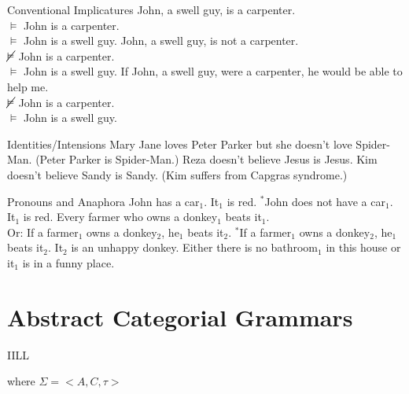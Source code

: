 \documentclass{beamer}
\begin{document}
\begin{frame}{Conventional Implicatures}
John, a swell guy, is a carpenter. \\
$\vDash$ John is a carpenter. \\
$\vDash$ John is a swell guy.
\vfill
\pause
John, a swell guy, is not a carpenter. \\
$\cancel{\vDash}$ John is a carpenter. \\
$\vDash$ John is a swell guy.
\vfill
\pause
If John, a swell guy, were a carpenter, he would be able to help me. \\
$\cancel{\vDash}$ John is a carpenter. \\
$\vDash$ John is a swell guy.
\end{frame}


\begin{frame}{Identities/Intensions}
Mary Jane loves Peter Parker but she doesn't love Spider-Man. (Peter Parker
is Spider-Man.)
\vfill
\pause
Reza doesn't believe Jesus is Jesus.
\vfill
\pause
Kim doesn't believe Sandy is Sandy. (Kim suffers from Capgras syndrome.)
\end{frame}


\begin{frame}{Pronouns and Anaphora}
  John has a car$_1$. It$_1$ is red.
  \vfill
  \pause
  $^*$John does not have a car$_1$. It$_1$ is red.
  \vfill
  \pause
  Every farmer who owns a donkey$_1$ beats it$_1$. \\
  \pause
  Or: If a farmer$_1$ owns a donkey$_2$, he$_1$ beats it$_2$.
  \vfill
  \pause
  $^*$If a farmer$_1$ owns a donkey$_2$, he$_1$ beats it$_2$. It$_2$ is an
  unhappy donkey.
  \vfill
  \pause
  Either there is no bathroom$_1$ in this house or it$_1$ is in a funny
  place.
\end{frame}



\section{Abstract Categorial Grammars}


\begin{frame}{IILL}
  \begin{prooftree}
  \end{prooftree}
  \begin{prooftree}
  \end{prooftree}
  \begin{prooftree}
  \end{prooftree}
  \begin{prooftree}
  \end{prooftree}
  \vfill
  where $\Sigma = \mathopen{<}A, C, \tau\mathclose{>}$
\end{frame}
\end{document}
